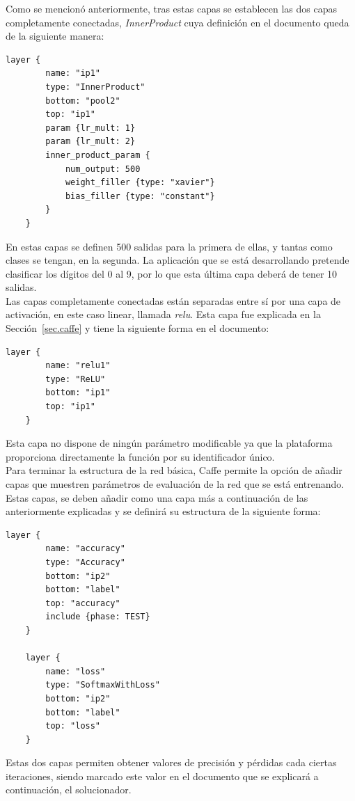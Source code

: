 	Como se mencionó anteriormente, tras estas capas se establecen las dos capas completamente conectadas, \textit{InnerProduct} cuya definición en el documento queda de la siguiente manera: 
	\vspace{10pt}
	\begin{lstlisting}[frame=single]
	layer {
		name: "ip1"
		type: "InnerProduct"
		bottom: "pool2"
		top: "ip1"
		param {lr_mult: 1}
		param {lr_mult: 2}
		inner_product_param {
			num_output: 500
			weight_filler {type: "xavier"}
			bias_filler {type: "constant"}
		}
	}	
	\end{lstlisting}
	
	En estas capas se definen 500 salidas para la primera de ellas, y tantas como clases se tengan, en la segunda. La aplicación que se está desarrollando pretende clasificar los dígitos del 0 al 9, por lo que esta última capa deberá de tener 10 salidas.\\

	Las capas completamente conectadas están separadas entre sí por una capa de activación, en este caso linear, llamada \textit{\acrshort{relu}}. Esta capa fue explicada en la Sección~\ref{sec.caffe} y tiene la siguiente forma en el documento:
	\vspace{10pt}
	\begin{lstlisting}[frame=single]
	layer {
		name: "relu1"
		type: "ReLU"
		bottom: "ip1"
		top: "ip1"
	}	
	\end{lstlisting}
	
	Esta capa no dispone de ningún parámetro modificable ya que la plataforma proporciona directamente la función por su identificador único.\\
	
	Para terminar la estructura de la red básica, Caffe permite la opción de añadir capas que muestren parámetros de evaluación de la red que se está entrenando. Estas capas, se deben añadir como una capa más a continuación de las anteriormente explicadas y se definirá su estructura de la siguiente forma:
	\vspace{10pt}
	\begin{lstlisting}[frame=single]
	layer {
		name: "accuracy"
		type: "Accuracy"
		bottom: "ip2"
		bottom: "label"
		top: "accuracy"
		include {phase: TEST}
	}
	
	layer {
		name: "loss"
		type: "SoftmaxWithLoss"
		bottom: "ip2"
		bottom: "label"
		top: "loss"
	}	
	\end{lstlisting}
	
	Estas dos capas permiten obtener valores de precisión y pérdidas cada ciertas iteraciones, siendo marcado este valor en el documento que se explicará a continuación, el solucionador.\\

